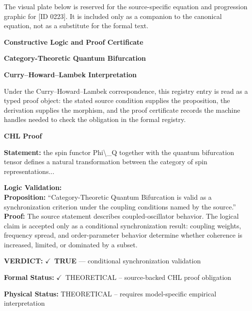 \begingroup\footnotesize\sloppy
The visual plate below is reserved for the source-specific equation and progression graphic for [ID 0223]. It is included only as a companion to the canonical equation, not as a substitute for the formal text.
\par\endgroup
\ifTZPDarkEdition
{}
\fi

\clearpage
\begingroup\tzpsupportsetup
\noindent\textbf{\fontsize{10.8pt}{12.8pt}\selectfont [ID 0223] Constructive Logic and Proof Certificate}\par
\noindent\textbf{\fontsize{10pt}{12pt}\selectfont Category-Theoretic Quantum Bifurcation}\par
\vspace{0.45em}
\begingroup
\footnotesize
\setlength{\parskip}{0.22em}
\setlength{\parindent}{0pt}
\noindent\textbf{Curry--Howard--Lambek Interpretation}\par
Under the Curry--Howard--Lambek correspondence, this registry entry is read as a typed proof
object: the stated source condition supplies the proposition, the derivation supplies the
morphism, and the proof certificate records the machine handles needed to check the obligation
in the formal registry.

\vspace{0.45em}
\noindent\textbf{CHL Proof}\par
\textbf{Statement:} the spin functor Phi\textbackslash{}\_Q together with the quantum bifurcation tensor defines a natural
transformation between the category of spin representations...

\textbf{Logic Validation:}\\
\textbf{Proposition:} ``Category-Theoretic Quantum Bifurcation is valid as a synchronization criterion under the
coupling conditions named by the source.''\\
\textbf{Proof:} The source statement describes coupled-oscillator behavior. The logical claim is
accepted only as a conditional synchronization result: coupling weights, frequency
spread, and order-parameter behavior determine whether coherence is increased, limited,
or dominated by a subset.

\textbf{VERDICT:} \ensuremath{\checkmark}\ \textbf{TRUE} --- conditional synchronization validation

\textbf{Formal Status:} \ensuremath{\checkmark}\ THEORETICAL -- source-backed CHL proof obligation

\textbf{Physical Status:} THEORETICAL -- requires model-specific empirical interpretation
\par\vspace{0.45em}
\par
\ifTZPDarkEdition
{}
\fi
\endgroup
\endgroup
